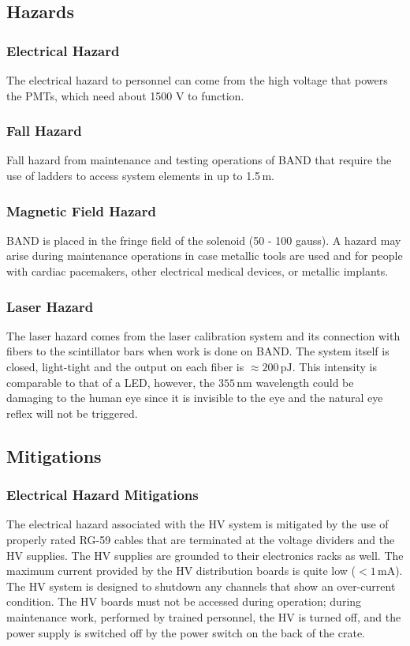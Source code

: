 \subsection{Hazards} 
\indent
\subsubsection{Electrical Hazard}
The electrical hazard to personnel can come from the high voltage that powers the PMTs, which need about 1500 V to function. 

\subsubsection{Fall Hazard}
Fall hazard from maintenance and testing operations of BAND that require the use of ladders to access system elements in up to 1.5\,m. 

\subsubsection{Magnetic Field Hazard}
BAND is placed in the fringe field of the solenoid (50 - 100 gauss). A hazard may arise during maintenance operations in case metallic tools are used and for people with cardiac pacemakers, other electrical medical devices, or metallic implants.

\subsubsection{Laser Hazard}
The laser hazard comes from the laser calibration system and its connection with fibers to the scintillator bars when work is done on BAND. The system itself is closed, light-tight and the output on each fiber is $\approx 200\,\mathrm{pJ}$. This intensity is comparable to that of a LED, however, the $355\,\mathrm{nm}$ wavelength could be damaging to the human eye since it is invisible to the eye and the natural eye reflex will not be triggered. 

\subsection{Mitigations}
\indent
\subsubsection{Electrical Hazard Mitigations} 
The electrical hazard associated with the HV system is mitigated by the use of properly rated RG-59 cables that are terminated at the voltage dividers and the HV supplies.
The HV supplies are grounded to their electronics racks as well. 
The maximum current provided by the HV distribution boards is quite low ($<1\,\mathrm{mA}$). The HV system is designed to shutdown any channels that show an over-current condition. The HV boards must not be accessed during operation; during maintenance work, performed by trained personnel, the HV is turned off, and the power supply is switched off by the power switch on the back of the crate.

